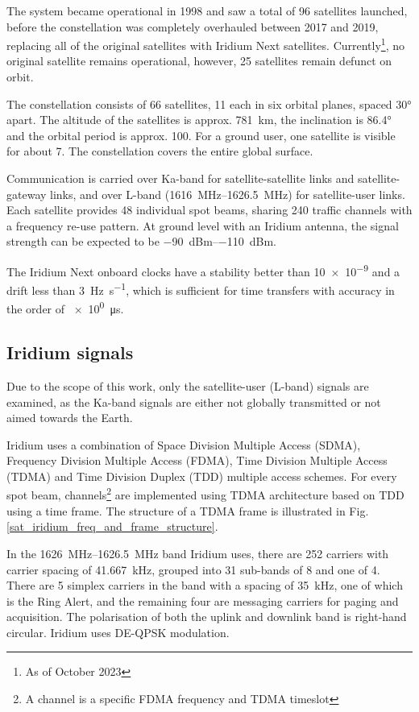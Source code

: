 The system became operational in 1998 and saw a total of 96 satellites launched, before the constellation was completely overhauled between 2017 and 2019, replacing all of the original satellites with Iridium Next satellites. Currently\footnote{As of October 2023}, no original satellite remains operational, however, 25 satellites remain defunct on orbit\cite{sat06}.

The constellation consists of 66 satellites, 11 each in six orbital planes, spaced \ang{30} apart. The altitude of the satellites is approx. \qty{781}{\km}, the inclination is \ang{86.4} and the orbital period is approx. \qty{100}{\min}. For a ground user, one satellite is visible for about \qty{7}{\min}. The constellation covers the entire global surface\cite{sat01}.

Communication is carried over Ka-band for satellite-satellite links and satellite-gateway links, and over L-band (\qtyrange{1616}{1626.5}{\mega\hertz}) for satellite-user links. Each satellite provides 48 individual spot beams, sharing 240 traffic channels with a frequency re-use pattern\cite{sat07}. At ground level with an Iridium antenna, the signal strength can be expected to be \qtyrange{-90}{-110}{dBm}\cite{sop01}.

The Iridium Next onboard clocks have a stability better than \num{10e-9} and a drift less than \qty{3}{\hertz\per\s}, which is sufficient for time transfers with accuracy in the order of \qty{e0}{\micro\s}\cite{sop11}.

\subsection{Iridium signals}
Due to the scope of this work, only the satellite-user (L-band) signals are examined, as the Ka-band signals are either not globally transmitted or not aimed towards the Earth.

Iridium uses a combination of Space Division Multiple Access (SDMA),  Frequency Division Multiple Access (FDMA), Time Division Multiple Access (TDMA) and Time Division Duplex (TDD) multiple access schemes\cite{sop11}. For every spot beam, channels\footnote{A channel is a specific FDMA frequency and TDMA timeslot\cite{sat07}} are implemented using TDMA architecture based on TDD using a time frame\cite{sop12}. The structure of a TDMA frame is illustrated in Fig. \ref{sat_iridium_freq_and_frame_structure}.

In the \qtyrange{1626}{1626.5}{\MHz} band Iridium uses, there are 252 carriers with carrier spacing of \qty{41.667}{\kHz}, grouped into 31 sub-bands of 8 and one of 4. There are 5 simplex carriers in the band with a spacing of \qty{35}{\kHz}, one of which is the Ring Alert, and the remaining four are messaging carriers for paging and acquisition. The polarisation of both the uplink and downlink band is right-hand circular. Iridium uses DE-QPSK modulation\cite{sat04}.

